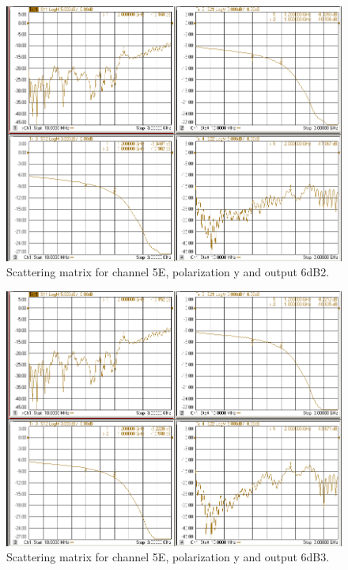 \documentclass[12pt,a4paper,oneside]{article}
\begin{document}
\begin{figure}[H]
\centering
\includegraphics[width=0.9\linewidth]{VNA_results/5Ey_6dB2.png}
\caption{Scattering matrix for channel 5E, polarization y and output 6dB2.}
\label{fig:5Ey_6dB2}
\end{figure}


\begin{figure}[H]
\centering
\includegraphics[width=0.9\linewidth]{VNA_results/5Ey_6dB3.png}
\caption{Scattering matrix for channel 5E, polarization y and output 6dB3.}
\label{fig:5Ey_6dB3}
\end{figure}
\end{document}
